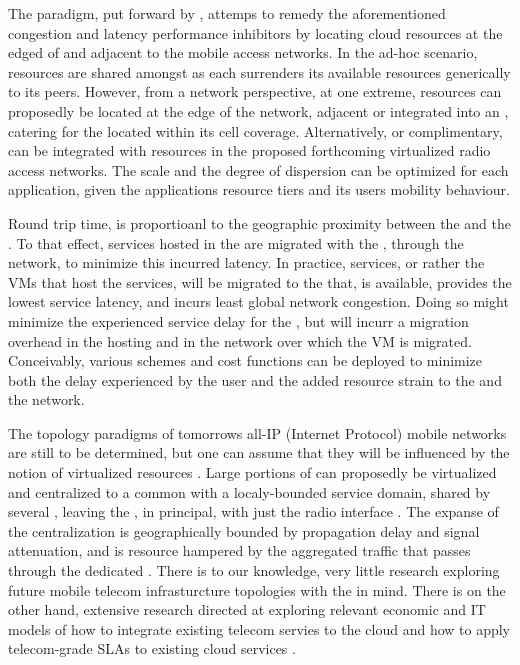 The \xcloud{} paradigm, put forward by \cite{chandra2013decentralized,ericsson_akami,satyanarayanan2009case,kiukkonen2010towards}, attemps to remedy the aforementioned congestion and latency performance inhibitors by locating cloud resources at the edged of and adjacent to the mobile access networks. In the ad-hoc scenario, resources are shared amongst \ues{} as each \ue{} surrenders its available resources generically to its peers. However, from a network perspective, at one extreme, \dc{} resources can proposedly be located at the edge of the network, adjacent or integrated into an \rbs{}, catering for the \ues{} located within its cell coverage. Alternatively, or complimentary, \dcs{} can be integrated with resources in the proposed forthcoming virtualized radio access networks. The scale and the degree of dispersion can be optimized for each application, given the applications resource tiers and its users mobility behaviour.

Round trip time, is proportioanl to the geographic proximity between the \ue{} and the \dc{}. To that effect, services hosted in the \xcloud{} are migrated with the \ue{}, through the network, to minimize this incurred latency. In practice, services, or rather the VMs that host the services, will be migrated to the \dc{} that, is available, provides the lowest service latency, and incurs least global network congestion. Doing so might minimize the experienced service delay for the \ue{}, but will incurr a migration overhead in the hosting \dc{} and in the network over which the VM is migrated. Conceivably, various schemes and cost functions can be deployed to minimize both the delay experienced by the user and the added resource strain to the \dc{} and the network.

The topology paradigms of tomorrows all-IP (Internet Protocol) mobile networks \cite{6144211,5357099} are still to be determined, but one can assume that they will be influenced by the notion of virtualized resources \cite{baroncelli2010network, chowdhury2009network}. Large portions of \rbss{} can proposedly be virtualized and centralized to a common \dc with a localy-bounded service domain, shared by several \rbss{}, leaving the \rbss, in principal, with just the radio interface \cite{melzercloud}. The expanse of the centralization is geographically bounded by propagation delay and signal attenuation, and is resource hampered by the aggregated traffic that passes through the dedicated \dc. There is to our knowledge, very little research exploring future mobile telecom infrasturcture topologies with the \xcloud{} in mind. There is on the other hand, extensive research directed at exploring relevant economic and IT models of how to integrate existing telecom servies to the cloud and how to apply telecom-grade SLAs to existing cloud services \cite{EricssonWhitePaper,6156350, 5357099}.

